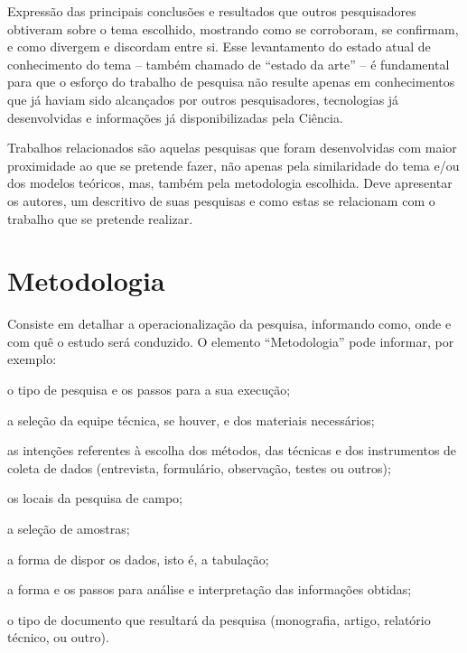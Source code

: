 \documentclass[12pt,oneside,a4paper,chapter=TITLE,section=TITLE,sumario
=tradicional]{abntex2}
\begin{document}
Expressão das principais conclusões e resultados que outros pesquisadores 
obtiveram sobre o tema escolhido, mostrando como se corroboram, se confirmam, e 
como divergem e discordam entre si. Esse levantamento do estado atual de 
conhecimento do tema – também chamado de ``estado da arte'' – é fundamental
para
que o esforço do trabalho de pesquisa não resulte apenas em conhecimentos que 
já haviam sido alcançados por outros pesquisadores, tecnologias já 
desenvolvidas e informações já disponibilizadas pela Ciência.

Trabalhos relacionados são aquelas pesquisas que foram desenvolvidas com maior 
proximidade ao que se pretende fazer, não apenas pela similaridade do tema e/ou 
dos modelos teóricos, mas, também pela metodologia escolhida. Deve apresentar 
os autores, um descritivo de suas pesquisas e como estas se relacionam com o 
trabalho que se pretende realizar.

\chapter{Metodologia}
\label{cap:metodologia}

Consiste em detalhar a operacionalização da pesquisa, informando como, onde e 
com quê o estudo será conduzido. O elemento ``Metodologia'' pode informar, por 
exemplo:
 
\begin{lista}
    \item  o tipo de pesquisa e os passos para a sua execução;

    \item a seleção da equipe técnica, se houver, e dos materiais
necessários;

    \item as intenções referentes à escolha dos métodos, das técnicas
e dos instrumentos de coleta de dados (entrevista, formulário,
observação, testes ou outros);

    \item os locais da pesquisa de campo;

    \item a seleção de amostras;

    \item a forma de dispor os dados, isto é, a tabulação;

    \item a forma e os passos para análise e interpretação das
informações obtidas;

    \item o tipo de documento que resultará da pesquisa (monografia,
artigo, relatório técnico, ou outro).
\end{lista}
\end{document}
